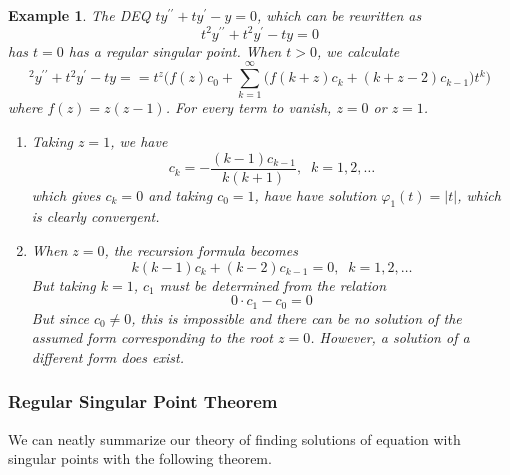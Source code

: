 \documentclass{article}
\newtheorem{example}{Example}[section]
\theoremstyle{remark}
\theoremstyle{definition}
\begin{document}
\begin{example}
The DEQ $t y^{\prime\prime} + ty^\prime - y = 0$, which can be rewritten as
\[t^2 y^{\prime\prime} + t^2 y^\prime - ty = 0\]
has $t = 0$ has a regular singular point. When $t>0$, we calculate
\[^2 y^{\prime\prime} + t^2 y^\prime - ty =  = t^z \bigg( f(z) c_0 + \sum_{k=1}^\infty \big( f(k+z) c_k + (k+z-2) c_{k-1}\big) t^k \bigg)\]
where $f(z) = z (z-1)$. For every term to vanish, $z = 0$ or $z = 1$. 
\begin{enumerate}
    \item Taking $z = 1$, we have 
    \[c_k = -\frac{(k-1) c_{k-1}}{k (k+1)}, \;\; k = 1, 2, \ldots\]
    which gives $c_k = 0$ and taking $c_0 = 1$, have have solution $\varphi_1 (t) = |t|$, which is clearly convergent. 
    \item When $z=0$, the recursion formula becomes
    \[k(k-1) c_k + (k-2) c_{k-1} = 0, \;\; k = 1, 2, \ldots\]
    But taking $k=1$, $c_1$ must be determined from the relation 
    \[0 \cdot c_1 - c_0 = 0\]
    But since $c_0 \neq 0$, this is impossible and there can be no solution of the assumed form corresponding to the root $z=0$. However, a solution of a different form does exist. 
\end{enumerate}
\end{example}

\subsubsection{Regular Singular Point Theorem}
We can neatly summarize our theory of finding solutions of equation with singular points with the following theorem. 
\end{document}
